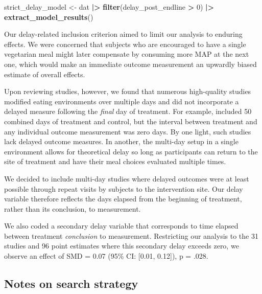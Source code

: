 \documentclass[sn-nature,referee,pdflatex]{sn-jnl}
\newenvironment{Shaded}{\begin{snugshade}}{\end{snugshade}}
\newcommand{\DecValTok}[1]{\textcolor[rgb]{0.00,0.00,0.81}{#1}}
\newcommand{\FunctionTok}[1]{\textcolor[rgb]{0.13,0.29,0.53}{\textbf{#1}}}
\newcommand{\NormalTok}[1]{#1}
\newcommand{\OtherTok}[1]{\textcolor[rgb]{0.56,0.35,0.01}{#1}}
\newcommand{\SpecialCharTok}[1]{\textcolor[rgb]{0.81,0.36,0.00}{\textbf{#1}}}
\begin{document}
\begin{Shaded}
\begin{Highlighting}[]
\NormalTok{strict\_delay\_model }\OtherTok{\textless{}{-}}\NormalTok{ dat }\SpecialCharTok{|\textgreater{}} \FunctionTok{filter}\NormalTok{(delay\_post\_endline }\SpecialCharTok{\textgreater{}} \DecValTok{0}\NormalTok{) }\SpecialCharTok{|\textgreater{}} \FunctionTok{extract\_model\_results}\NormalTok{()}
\end{Highlighting}
\end{Shaded}

Our delay-related inclusion criterion aimed to limit our analysis to
enduring effects. We were concerned that subjects who are encouraged to
have a single vegetarian meal might later compensate by consuming more
MAP at the next one, which would make an immediate outcome measurement
an upwardly biased estimate of overall effects.

Upon reviewing studies, however, we found that numerous high-quality
studies modified eating environments over multiple days and did not
incorporate a delayed measure following the \emph{final} day of
treatment. For example, \citep{andersson2021} included 50 combined days
of treatment and control, but the interval between treatment and any
individual outcome measurement was zero days. By one light, such studies
lack delayed outcome measures. In another, the multi-day setup in a
single environment allows for theoretical delay so long as participants
can return to the site of treatment and have their meal choices
evaluated multiple times.

We decided to include multi-day studies where delayed outcomes were at
least possible through repeat visits by subjects to the intervention
site. Our delay variable therefore reflects the days elapsed from the
beginning of treatment, rather than its conclusion, to measurement.

We also coded a secondary delay variable that corresponds to time
elapsed between treatment \emph{conclusion} to measurement. Restricting
our analysis to the 31 studies and 96 point estimates where this
secondary delay exceeds zero, we observe an effect of SMD = 0.07 (95\%
CI: {[}0.01, 0.12{]}), p = .028.

\subsection{Notes on search strategy}\label{Sec5.2}

\end{document}
